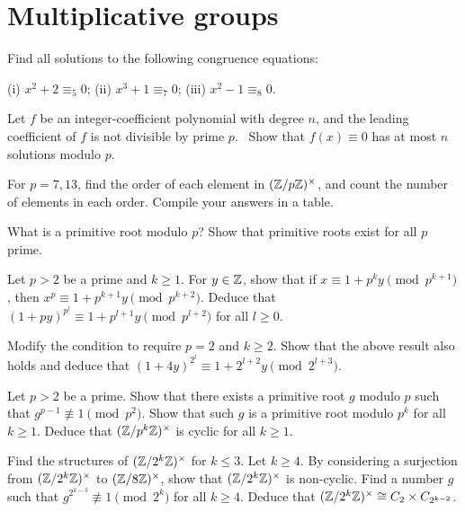 \section{Multiplicative groups}
\begin{question}{5}
    Find all solutions to the following congruence equations:

    (i) $x^2 + 2 \equiv_5 0$; (ii) $x^3 + 1 \equiv_7 0$; (iii) $x^2 - 1 \equiv_8 0$.

    Let $f$ be an integer-coefficient polynomial with degree $n$, and the leading coefficient of $f$ is not divisible by prime $p$. ~Show that $f(x) \equiv 0$ has at most $n$ solutions modulo $p$.
\end{question}

\begin{question}{6}
    For $p = 7,13$, find the order of each element in $(\mathbb{Z}/p\mathbb{Z})^\times$, and count the number of elements in each order. Compile your answers in a table.

    What is a primitive root modulo $p$? Show that primitive roots exist for all $p$ prime.
\end{question}

\begin{question}{7}
    Let $p > 2$ be a prime and $k \geq 1$. For $y\in \mathbb{Z}$, show that if $x \equiv 1 + p^k y \pmod{p^{k+1}}$, then $x^p \equiv 1 + p^{k+1} y \pmod{p^{k+2}}$. Deduce that $(1+py)^{p^l} \equiv 1 + p^{l+1}y \pmod{p^{l+2}}$ for all $l \geq 0$.
    
    Modify the condition to require $p = 2$ and $k \geq 2$. Show that the above result also holds and deduce that $(1 + 4 y)^{2^l} \equiv 1 + 2^{l+2}y \pmod{2^{l+3}}$.
\end{question}

\begin{question}{8}
Let $p > 2$ be a prime.  Show that there exists a primitive root $g$ modulo $p$ such that $g^{p-1} \not \equiv 1 \pmod{p^2}$. Show that such $g$ is a primitive root modulo $p^k$ for all $k \geq 1$. Deduce that $(\mathbb{Z}/p^k\mathbb{Z})^\times$ is cyclic for all $k \geq 1$.

Find the structures of $(\mathbb{Z}/2^k\mathbb{Z})^\times$ for $k\leq 3$. Let $k \geq 4$.  By considering a surjection from $(\mathbb{Z}/2^k\mathbb{Z})^\times$ to $(\mathbb{Z}/8\mathbb{Z})^\times$, show that $(\mathbb{Z}/2^k\mathbb{Z})^\times$ is non-cyclic. Find a number $g$ such that $g^{2^{k-3}} \not \equiv 1 \pmod{2^{k}}$ for all $k \geq 4$. Deduce that $(\mathbb{Z}/2^k\mathbb{Z})^\times \cong C_2 \times C_{2^{k-2}}$.
\end{question}

